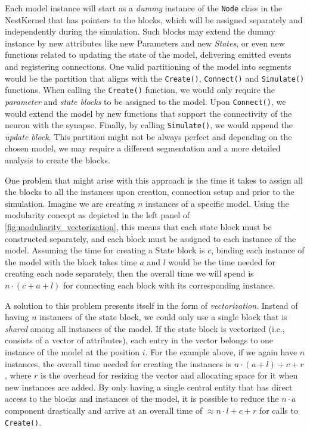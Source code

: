 Each model instance will start as a \emph{dummy} instance of the \texttt{Node} class in the NestKernel that has pointers to the blocks, which will be assigned separately and independently during the simulation. Such blocks may extend the dummy instance by new attributes like new Parameters and new \emph{States}, or even new functions related to updating the state of the model, delivering emitted events and registering connections. One valid partitioning of the model into segments would be the partition that aligns with the \texttt{Create()}, \texttt{Connect()} and \texttt{Simulate()} functions. When calling the \texttt{Create()} function, we would only require the \emph{parameter} and \emph{state blocks} to be assigned to the model. Upon \texttt{Connect()}, we would extend the model by new functions that support the connectivity of the neuron with the synapse. Finally, by calling \texttt{Simulate()}, we would append the \emph{update block}. This partition might not be always perfect and depending on the chosen model, we may require a different segmentation and a more detailed analysis to create the blocks. 

One problem that might arise with this approach is the time it takes to assign all the blocks to all the instances upon creation, connection setup and prior to the simulation. Imagine we are creating $n$ instances of a specific model. Using the modularity concept as depicted in the left panel of \autoref{fig:moduliarity_vectorization}, this  means that each state block must be constructed separately, and each block must be assigned to each instance of the model. Assuming the time for creating a State block is $c$, binding each instance of the model with the block takes time $a$ and $l$ would be the time needed for creating each node separately, then the overall time we will spend is $n \cdot (c + a + l)$ for connecting each block with its corresponding instance.

A solution to this problem presents itself in the form of \emph{vectorization}. Instead of having $n$ instances of the state block, we could only use a single block that is \emph{shared} among all instances of the model. If the state block is vectorized (i.e., consists of a vector of attributes), each entry in the vector belongs to one instance of the model at the position $i$. For the example above, if we again have $n$ instances, the overall time needed for creating the instances is $n \cdot (a + l) + c + r $, where $r$ is the overhead for resizing the vector and allocating space for it when new instances are added. By only having a single central entity that has direct access to the blocks and instances of the model, it is possible to reduce the $n \cdot a$ component drastically and arrive at an overall time of $ \approx n \cdot l + c + r $ for calls to \texttt{Create()}.

